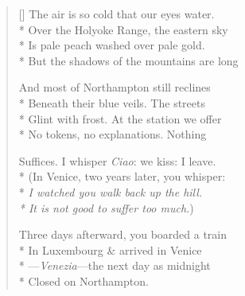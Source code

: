 \label{ch:last_words}
\settowidth{\versewidth}{Suffices.  I whisper Ciao: we kiss: I leave.}
\begin{verse}[\versewidth]
The air is so cold that our eyes water.\\*
Over the Holyoke Range, the eastern sky\\*
Is pale peach washed over pale gold.\\*
But the shadows of the mountains are long

And most of Northampton still reclines\\*
Beneath their blue veils.  The streets\\*
Glint with frost.  At the station we offer\\*
No tokens, no explanations.   Nothing

Suffices.  I whisper \textit{Ciao}: we kiss: I leave.\\*
(In Venice, two years later, you whisper:\\*
\textit{I watched you walk back up the hill.\\*
It is not good to suffer too much.})

Three days afterward, you boarded a train\\*
In Luxembourg \& arrived in Venice\\*
---\textit{Venezia}---the next day as midnight\\*
\qquad Closed on Northampton.
\end{verse}
